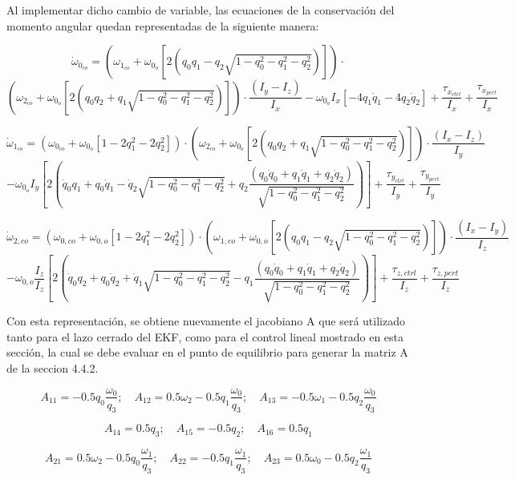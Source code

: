Al implementar dicho cambio de variable, las ecuaciones de la conservación del momento angular quedan representadas de la siguiente manera:

\[
\dot{\omega}_{0_{co}} = \left( \omega_{1_{co}} + \omega_{0_o} \left[ 2\left( q_0 q_1 - q_2 \sqrt{1 - q_0^2 - q_1^2 - q_2^2} \right) \right] \right) \cdot
\]
\[
 \left( \omega_{2_{co}} + \omega_{0_o} \left[ 2\left( q_0 q_2 + q_1 \sqrt{1 - q_0^2 - q_1^2 - q_2^2} \right) \right] \right) \cdot \frac{(I_y - I_z)}{I_x} - \omega_{0_o} I_x \left[ -4q_1 \dot{q}_1 - 4q_2 \dot{q}_2 \right] + \frac{\tau_{x_{ctrl}}}{I_x} + \frac{\tau_{x_{pert}}}{I_x}
\]

\[
\dot{\omega}_{1_{co}} = \left( \omega_{0_{co}} + \omega_{0_o} \left[ 1 - 2q_1^2 - 2q_2^2 \right] \right) \cdot \left( \omega_{2_{co}} + \omega_{0_o} \left[ 2\left( q_0 q_2 + q_1 \sqrt{1 - q_0^2 - q_1^2 - q_2^2} \right) \right] \right) \cdot \frac{(I_x - I_z)}{I_y}
\]
\[
- \omega_{0_o} I_y \left[ 2\left( \dot{q}_0 q_1 + q_0 \dot{q}_1 - \dot{q}_2 \sqrt{1 - q_0^2 - q_1^2 - q_2^2} + q_2 \frac{(q_0 \dot{q}_0 + q_1 \dot{q}_1 + q_2 \dot{q}_2)}{\sqrt{1 - q_0^2 - q_1^2 - q_2^2}} \right) \right] + \frac{\tau_{y_{ctrl}}}{I_y} + \frac{\tau_{y_{pert}}}{I_y}
\]

\[
\dot{\omega}_{2,co} = \left( \omega_{0,co} + \omega_{0,o} \left[ 1 - 2q_1^2 - 2q_2^2 \right] \right) \cdot \left( \omega_{1,co} + \omega_{0,o} \left[ 2 \left( q_0 q_1 - q_2 \sqrt{1 - q_0^2 - q_1^2 - q_2^2} \right) \right] \right) \cdot \frac{(I_x - I_y)}{I_z} 
\]
\[
- \omega_{0,o} \frac{I_z}{I_z} \left[ 2 \left( \dot{q}_0 q_2 + q_0 \dot{q}_2 + \dot{q}_1 \sqrt{1 - q_0^2 - q_1^2 - q_2^2} - q_1 \frac{(q_0 \dot{q}_0 + q_1 \dot{q}_1 + q_2 \dot{q}_2)}{\sqrt{1 - q_0^2 - q_1^2 - q_2^2}} \right) \right] 
+ \frac{\tau_{z,ctrl}}{I_z} + \frac{\tau_{z,pert}}{I_z}
\]

Con esta representación, se obtiene nuevamente el jacobiano A que será utilizado tanto para el lazo cerrado del EKF, como para el control lineal mostrado en esta sección, la cual se debe evaluar en el punto de equilibrio para generar la matriz A de la seccion 4.4.2.

\[
A_{11} = -0.5q_0 \frac{\omega_0}{q_3}; \quad A_{12} = 0.5\omega_{2}-0.5q_1 \frac{\omega_0}{q_3}; \quad A_{13} = -0.5\omega_{1}-0.5q_2 \frac{\omega_0}{q_3}
\]

\[
A_{14} = 0.5q_3; \quad A_{15} = -0.5q_2; \quad A_{16} = 0.5q_{1}
\]

\[
A_{21} = 0.5\omega_{2}-0.5q_0 \frac{\omega_1}{q_3}; \quad A_{22} = -0.5q_1 \frac{\omega_1}{q_3}; \quad A_{23} = 0.5\omega_{0}-0.5q_2 \frac{\omega_1}{q_3}
\]

